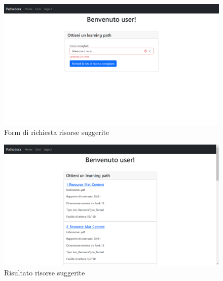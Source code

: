 \begin{figure}[H]
\centering
\includegraphics[scale=0.4]{res/resources-generation.png}
\caption{Form di richiesta risorse suggerite}
\label{fig:resources-generation}
\end{figure}

\begin{figure}[H]
\centering
\includegraphics[scale=0.4]{res/path-result.png}
\caption{Risultato risorse suggerite}
\label{fig:resources-generation}
\end{figure}